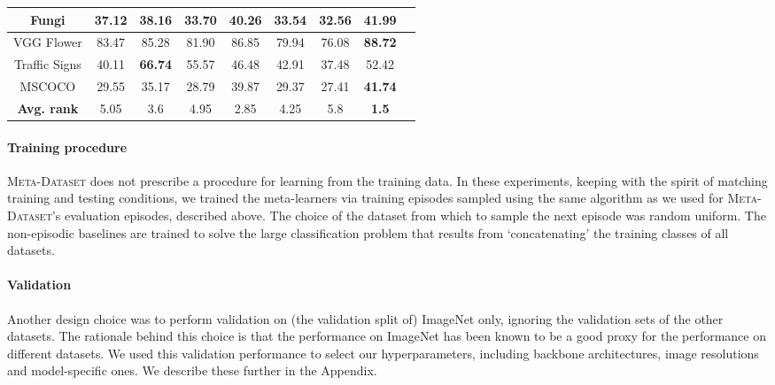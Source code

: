 \documentclass{article} \usepackage{iclr2020_conference,times}
\newcommand{\benchmark}{\textsc{Meta-Dataset}\xspace}
\begin{document}
\begin{table*}[t]
\begin{tabular}{|c|c|c|c|c|c|c|c|c|}
Fungi                       & 37.12                & 38.16                  & 33.70                     & 40.26                  & 33.54                 & 32.56                      & \bf{41.99}        \\\hline
VGG Flower                  & 83.47                & 85.28                  & 81.90                     & 86.85                  & 79.94                 & 76.08                      & \bf{88.72}        \\\hline
Traffic Signs               & 40.11                & \bf{66.74}             & 55.57                     & 46.48                  & 42.91                 & 37.48                      & 52.42             \\\hline
MSCOCO                      & 29.55                & 35.17                  & 28.79                     & 39.87                  & 29.37                 & 27.41                      & \bf{41.74}        \\\hline\hline
\textbf{Avg. rank}          & 5.05 & 3.6 & 4.95 & 2.85 & 4.25 & 5.8 & \bf{1.5}\\\hline
\end{tabular}
\end{table*}
 
\paragraph{Training procedure} \benchmark does not prescribe a procedure for learning from the training data.
In these experiments, keeping with the spirit of matching training and testing conditions, we trained
the meta-learners via training episodes sampled using the same algorithm as we used for \benchmark's evaluation episodes, described
above. The choice of the dataset from which to sample the next episode was random uniform. The non-episodic baselines are trained to solve the large classification problem that results from `concatenating' the training classes of all datasets. 

\paragraph{Validation} Another design choice was to perform validation on (the validation split of) ImageNet
only, ignoring the validation sets of the other datasets. The rationale behind
this choice is that the performance on ImageNet has been known to be a good
proxy for the performance on different datasets. 
We used this validation performance to select our hyperparameters, including backbone architectures, image resolutions and model-specific ones. We describe these further in the Appendix.
\end{document}

